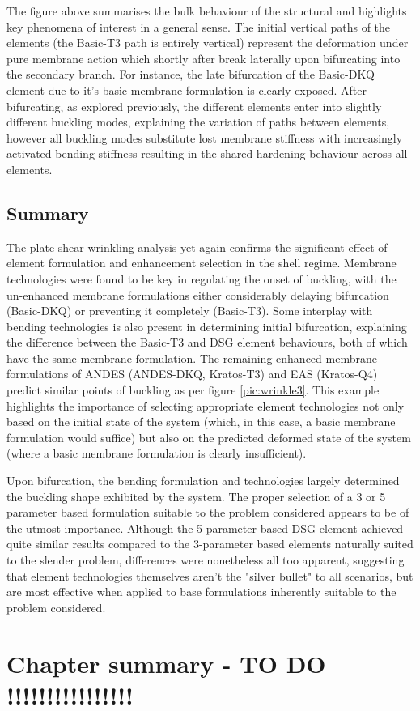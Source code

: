 The figure above summarises the bulk behaviour of the structural and highlights key phenomena of interest in a general sense. The initial vertical paths of the elements (the Basic-T3 path is entirely vertical) represent the deformation under pure membrane action which shortly after break laterally upon bifurcating into the secondary branch. For instance, the late bifurcation of the Basic-DKQ element due to it's basic membrane formulation is clearly exposed. After bifurcating, as explored previously, the different elements enter into slightly different buckling modes, explaining the variation of paths between elements, however all buckling modes substitute lost membrane stiffness with increasingly activated bending stiffness resulting in the shared hardening behaviour across all elements.

\subsection{Summary}

The plate shear wrinkling analysis yet again confirms the significant effect of element formulation and enhancement selection in the shell regime. Membrane technologies were found to be key in regulating the onset of buckling, with the un-enhanced membrane formulations either considerably delaying bifurcation (Basic-DKQ) or preventing it completely (Basic-T3). Some interplay with bending technologies is also present in determining initial bifurcation, explaining the difference between the Basic-T3 and DSG element behaviours, both of which have the same membrane formulation. The remaining enhanced membrane formulations of ANDES (ANDES-DKQ, Kratos-T3) and EAS (Kratos-Q4) predict similar points of buckling as per figure \ref{pic:wrinkle3}. This example highlights the importance of selecting appropriate element technologies not only based on the initial state of the system (which, in this case, a basic membrane formulation would suffice) but also on the predicted deformed state of the system (where a basic membrane formulation is clearly insufficient).

 Upon bifurcation, the bending formulation and technologies largely determined the buckling shape exhibited by the system. The proper selection of a 3 or 5 parameter based formulation suitable to the problem considered appears to be of the utmost importance. Although the 5-parameter based DSG element achieved quite similar results compared to the 3-parameter based elements naturally suited to the slender problem, differences were nonetheless all too apparent, suggesting that element technologies themselves aren't the "silver bullet" to all scenarios, but are most effective when applied to base formulations inherently suitable to the problem considered.
 
\section{Chapter summary - TO DO !!!!!!!!!!!!!!!!}